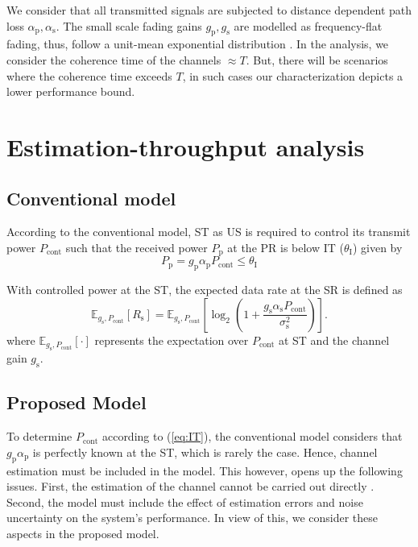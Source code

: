 \documentclass[conference, twocolumn]{IEEEtran}
\newcommand{\e}[2]{{\mathbb E}_{#1}\left[ #2 \right]}
\newcommand{\sub}[1]{_{\text{#1}}}
\newcommand{\preg}{P\sub{cont}}
\newcommand{\pp}{P\sub{p}}
\newcommand{\ite}{\theta\sub{I}}
\newcommand{\rs}{R\sub{s}}
\newcommand{\gp}{g\sub{p}}
\newcommand{\gs}{g\sub{s}}
\newcommand{\ap}{\alpha\sub{p}}
\newcommand{\as}{\alpha\sub{s}}
\newcommand{\nps}{\sigma^2\sub{s}}
\begin{document}
We consider that all transmitted signals are subjected to distance dependent path loss $\ap, \as$. The small scale fading gains $\gp, \gs$ are modelled as frequency-flat fading, thus, follow a unit-mean exponential distribution \cite{Tse05}. In the analysis, we consider the coherence time of the channels $\approx T$. But, there will be scenarios where the coherence time exceeds $T$, in such cases our characterization depicts a lower performance bound. 



\section{Estimation-throughput analysis} \label{sec:et_ana}

\subsection{Conventional model}
According to the conventional model, ST as US is required to control its transmit power $\preg$ such that the received power $\pp$ at the PR is below IT ($\ite$) \cite{Xing07} given by
\begin{equation}
\pp = \gp \ap \preg \le \ite 
\label{eq:IT}
\end{equation}

With controlled power at the ST, the expected data rate at the SR is defined as
\begin{equation}
\e{\gs, \preg}{\rs} = \e{\gs, \preg}{\log_2 \left(1 + \frac{\gs \as \preg}{\nps} \right)}. 
\label{eq:Thr_cm}
\end{equation}
where $\e{\gs, \preg}{\cdot}$ represents the expectation over $\preg$ at ST and the channel gain $\gs$. 
\subsection{Proposed Model} 

To determine $\preg$ according to (\ref{eq:IT}), the conventional model considers that $\gp \ap$ is perfectly known at the ST, which is rarely the case. Hence, channel estimation must be included in the model. This however, opens up the following issues. First, the estimation of the channel cannot be carried out directly \cite{Tian12, Sharma13}. Second, the model must include the effect of estimation errors and noise uncertainty on the system's performance. In view of this, we consider these aspects in the proposed model. 
\end{document}
